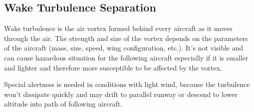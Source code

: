 



\subsection{Wake Turbulence Separation}

Wake turbulence is the air vortex formed behind every aircraft as it moves through the air. The strength and size of the vortex depends on the parameters of the aircraft (mass, size, speed, wing configuration, etc.). It's not visible and can cause hazardous situation for the following aircraft especially if it is smaller and lighter and therefore more susceptible to be affected by the vortex.

Special alertness is needed in conditions with light wind, because the turbulence won't dissipate quickly and may drift to parallel runway or descend to lower altitude into path of following aircraft.

